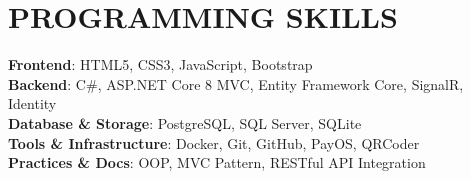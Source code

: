 \documentclass[letterpaper,11pt]{article}
\begin{document}
\section{PROGRAMMING SKILLS}
 \begin{itemize}[leftmargin=0.15in, label={$\bullet$}]
    \small{\item{
     \textbf{Frontend}{: HTML5, CSS3, JavaScript, Bootstrap} \\ \vspace{2pt}
     \textbf{Backend}{: C\#, ASP.NET Core 8 MVC, Entity Framework Core, SignalR, Identity} \\ \vspace{2pt}
     \textbf{Database \& Storage}{: PostgreSQL, SQL Server, SQLite} \\ \vspace{2pt}
     \textbf{Tools \& Infrastructure}{: Docker, Git, GitHub, PayOS, QRCoder} \\ \vspace{2pt}
     \textbf{Practices \& Docs}{: OOP, MVC Pattern, RESTful API Integration} \\
    }}
 \end{itemize}
\end{document}
